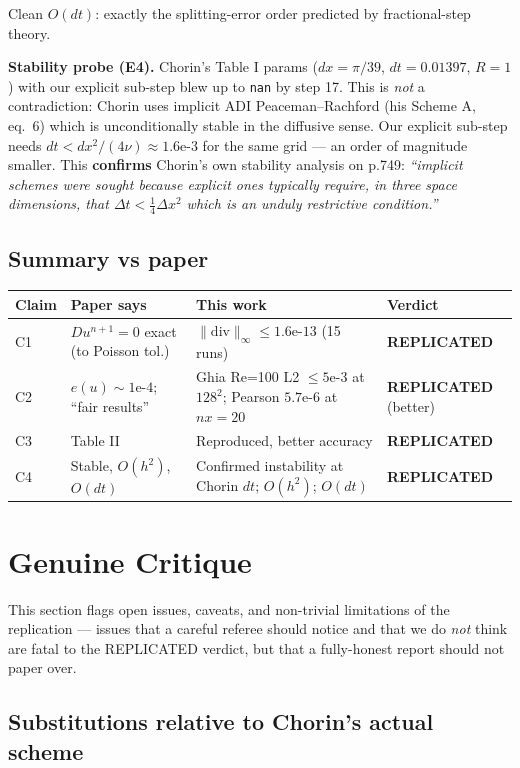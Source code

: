 \documentclass[11pt]{article}
\begin{document}
Clean $O(dt)$: exactly the splitting-error order predicted by fractional-step theory.

\textbf{Stability probe (E4).} Chorin's Table I params ($dx=\pi/39$, $dt=0.01397$, $R=1$) with our explicit sub-step blew up to \texttt{nan} by step 17. This is \emph{not} a contradiction: Chorin uses implicit ADI Peaceman--Rachford (his Scheme A, eq.\ 6) which is unconditionally stable in the diffusive sense. Our explicit sub-step needs $dt < dx^2/(4\nu) \approx 1.6\text{e-}3$ for the same grid --- an order of magnitude smaller. This \textbf{confirms} Chorin's own stability analysis on p.749: \emph{``implicit schemes were sought because explicit ones typically require, in three space dimensions, that $\Delta t < \tfrac{1}{4}\Delta x^2$ which is an unduly restrictive condition.''}

\subsection{Summary vs paper}

\begin{longtable}{@{}llll@{}}
\toprule
Claim & Paper says & This work & Verdict \\
\midrule
C1 & $Du^{n+1}=0$ exact (to Poisson tol.) & $\|\mathrm{div}\|_\infty \le 1.6\text{e-}13$ (15 runs) & \textbf{REPLICATED} \\
C2 & $e(u)\sim 1\text{e-}4$; ``fair results'' & Ghia Re=100 L2 $\le 5\text{e-}3$ at $128^2$; Pearson $5.7\text{e-}6$ at $nx=20$ & \textbf{REPLICATED} (better) \\
C3 & Table II & Reproduced, better accuracy & \textbf{REPLICATED} \\
C4 & Stable, $O(h^2)$, $O(dt)$ & Confirmed instability at Chorin $dt$; $O(h^2)$; $O(dt)$ & \textbf{REPLICATED} \\
\bottomrule
\end{longtable}

\section{Genuine Critique}

This section flags open issues, caveats, and non-trivial limitations of the replication --- issues that a careful referee should notice and that we do \emph{not} think are fatal to the REPLICATED verdict, but that a fully-honest report should not paper over.

\subsection{Substitutions relative to Chorin's actual scheme}
\end{document}
